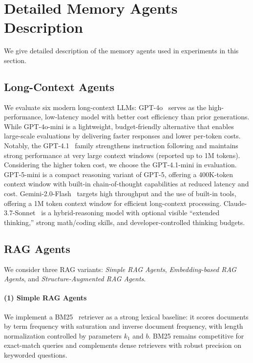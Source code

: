 \section{Detailed Memory Agents Description}
\label{sec:agents_intro}

We give detailed description of the memory agents used in experiments in this section.

\subsection{Long-Context Agents}

We evaluate six modern long-context LLMs: GPT-4o~\citep{openai2025gpt4o} serves as the high-performance, low-latency model with better cost efficiency than prior generations. While GPT-4o-mini is a lightweight, budget-friendly alternative that enables large-scale evaluations by delivering faster responses and lower per-token costs. Notably, the GPT-4.1~\citep{openai2025gpt4.1mini} family strengthens instruction following and maintains strong performance at very large context windows (reported up to 1M tokens). Considering the higher token cost, we choose the GPT-4.1-mini in evaluation. GPT-5-mini is a compact reasoning variant of GPT-5\citep{openai2025gpt5mini}, offering a 400K-token context window with built-in chain-of-thought capabilities at reduced latency and cost. Gemini-2.0-Flash~\citep{deepmind2025gemini} targets high throughput and the use of built-in tools, offering a 1M token context window for efficient long-context processing. Claude-3.7-Sonnet~\citep{anthropic2025claude37} is a hybrid-reasoning model with optional visible “extended thinking,” strong math/coding skills, and developer-controlled thinking budgets. 

\subsection{RAG Agents}

We consider three RAG variants: \emph{Simple RAG Agents}, \emph{Embedding-based RAG Agents}, and \emph{Structure-Augmented RAG Agents}. 

\paragraph{ (1) Simple RAG Agents}  We implement a BM25~\citep{bm25} retriever as a strong lexical baseline: it scores documents by term frequency with saturation and inverse document frequency, with length normalization controlled by parameters $k_1$ and $b$. BM25 remains competitive for exact-match queries and complements dense retrievers with robust precision on keyworded questions.

